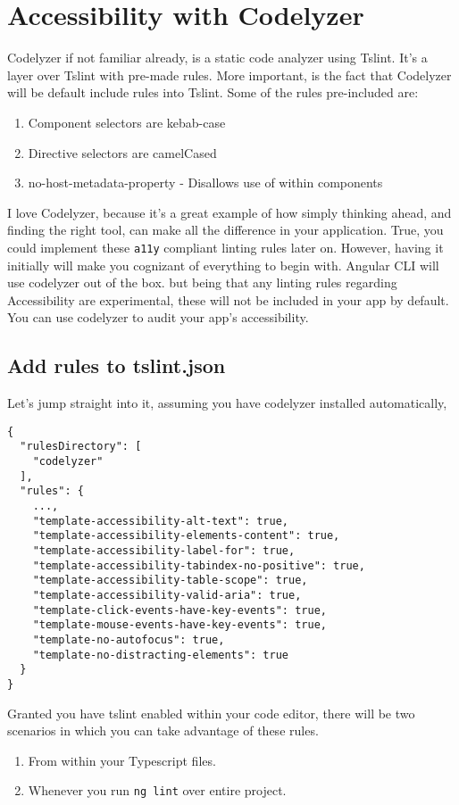 \chapter{ Accessibility with Codelyzer}    
Codelyzer if not familiar already, is a static code analyzer using Tslint. It's a layer over Tslint with pre-made rules. More important, is the fact that Codelyzer will be default include rules into Tslint. Some of the rules pre-included are: 
\begin{enumerate}
  \item Component selectors are kebab-case
  \item Directive selectors are camelCased
  \item no-host-metadata-property - Disallows use of  within components
\end{enumerate}

I love Codelyzer, because it's a great example of how simply thinking ahead, and finding the right tool, can make all the difference in your application. True, you could implement these \lstinline{a11y} compliant linting rules later on. However, having it initially will make you cognizant of everything to begin with. Angular CLI will use codelyzer out of the box. but being that any linting rules regarding Accessibility are experimental, these will not be included in your app by default. You can use codelyzer to audit your app's accessibility. 

\section{Add rules to tslint.json}
Let's jump straight into it, assuming you have codelyzer installed automatically,
\begin{lstlisting}
{
  "rulesDirectory": [
    "codelyzer"
  ],
  "rules": {
    ...,
    "template-accessibility-alt-text": true,
    "template-accessibility-elements-content": true,
    "template-accessibility-label-for": true,
    "template-accessibility-tabindex-no-positive": true,
    "template-accessibility-table-scope": true,
    "template-accessibility-valid-aria": true,
    "template-click-events-have-key-events": true,
    "template-mouse-events-have-key-events": true,
    "template-no-autofocus": true,
    "template-no-distracting-elements": true
  }
}  
\end{lstlisting}

Granted you have tslint enabled within your code editor, there will be two scenarios in which you can take advantage of these rules. 
\begin{enumerate}
  \item From within your Typescript files.
  \item Whenever you run \lstinline{ng lint} over entire project.
\end{enumerate}